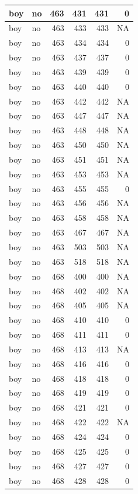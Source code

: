 \documentclass[man]{apa6}
\begin{document}
\begin{tabular}{l|l|r|r|r|r}
\hline
boy & no & 463 & 431 & 431 & 0\\
\hline
boy & no & 463 & 433 & 433 & NA\\
\hline
boy & no & 463 & 434 & 434 & 0\\
\hline
boy & no & 463 & 437 & 437 & 0\\
\hline
boy & no & 463 & 439 & 439 & 0\\
\hline
boy & no & 463 & 440 & 440 & 0\\
\hline
boy & no & 463 & 442 & 442 & NA\\
\hline
boy & no & 463 & 447 & 447 & NA\\
\hline
boy & no & 463 & 448 & 448 & NA\\
\hline
boy & no & 463 & 450 & 450 & NA\\
\hline
boy & no & 463 & 451 & 451 & NA\\
\hline
boy & no & 463 & 453 & 453 & NA\\
\hline
boy & no & 463 & 455 & 455 & 0\\
\hline
boy & no & 463 & 456 & 456 & NA\\
\hline
boy & no & 463 & 458 & 458 & NA\\
\hline
boy & no & 463 & 467 & 467 & NA\\
\hline
boy & no & 463 & 503 & 503 & NA\\
\hline
boy & no & 463 & 518 & 518 & NA\\
\hline
boy & no & 468 & 400 & 400 & NA\\
\hline
boy & no & 468 & 402 & 402 & NA\\
\hline
boy & no & 468 & 405 & 405 & NA\\
\hline
boy & no & 468 & 410 & 410 & 0\\
\hline
boy & no & 468 & 411 & 411 & 0\\
\hline
boy & no & 468 & 413 & 413 & NA\\
\hline
boy & no & 468 & 416 & 416 & 0\\
\hline
boy & no & 468 & 418 & 418 & 0\\
\hline
boy & no & 468 & 419 & 419 & 0\\
\hline
boy & no & 468 & 421 & 421 & 0\\
\hline
boy & no & 468 & 422 & 422 & NA\\
\hline
boy & no & 468 & 424 & 424 & 0\\
\hline
boy & no & 468 & 425 & 425 & 0\\
\hline
boy & no & 468 & 427 & 427 & 0\\
\hline
boy & no & 468 & 428 & 428 & 0\\

\end{tabular}
\end{document}
